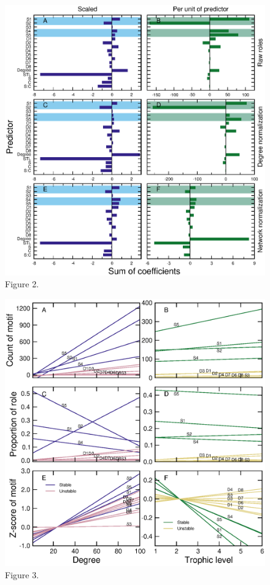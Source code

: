 \documentclass[12pt]{article}
\begin{document}
	\begin{figure}[h!]
		\caption{Figure 2.}
        \label{coefficient_sum}
        \includegraphics[height=0.6\textheight]{figures/PLS/total_coefficients.eps}
        \end{figure}

    \clearpage
    
	\begin{figure}[h!]
		\caption{Figure 3.}
        \label{motif_vs_degTL}
        \includegraphics[height=.65\textheight]{figures/roles/motif_vs_oneD.eps}
		\end{figure}
\end{document}
